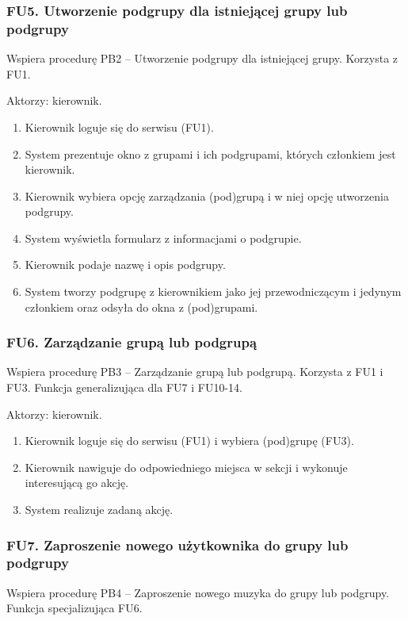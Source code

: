 \documentclass[11pt,a4paper]{article}
\renewcommand{\_}{\char`_}
\begin{document}
\subsubsection{FU5. Utworzenie podgrupy dla istniejącej grupy lub podgrupy}

Wspiera procedurę PB2 – Utworzenie podgrupy dla istniejącej grupy. Korzysta z FU1.

Aktorzy: kierownik.
\begin{enumerate}
    \item Kierownik loguje się do serwisu (FU1).
    \item System prezentuje okno z grupami i ich podgrupami, których członkiem jest kierownik.
    \item Kierownik wybiera opcję zarządzania (pod)grupą i w niej opcję utworzenia podgrupy.
    \item System wyświetla formularz z informacjami o podgrupie.
    \item Kierownik podaje nazwę i opis podgrupy.
    \item System tworzy podgrupę z kierownikiem jako jej przewodniczącym i jedynym członkiem oraz odsyła do okna z (pod)grupami.
\end{enumerate}

\subsubsection{FU6. Zarządzanie grupą lub podgrupą}

Wspiera procedurę PB3 – Zarządzanie grupą lub podgrupą. Korzysta z FU1 i FU3. Funkcja generalizująca dla FU7 i FU10-14.

Aktorzy: kierownik.
\begin{enumerate}
    \item Kierownik loguje się do serwisu (FU1) i wybiera (pod)grupę (FU3).
    \item Kierownik nawiguje do odpowiedniego miejsca w sekcji i wykonuje interesującą go akcję.
    \item System realizuje zadaną akcję.
\end{enumerate}

\subsubsection{FU7. Zaproszenie nowego użytkownika do grupy lub podgrupy}

Wspiera procedurę PB4 – Zaproszenie nowego muzyka do grupy lub podgrupy. Funkcja specjalizująca FU6.
\end{document}
